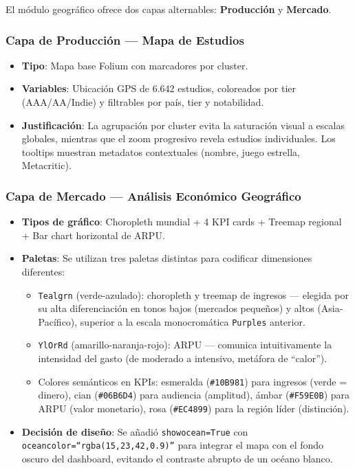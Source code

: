 \documentclass[11pt,a4paper]{article}
\begin{document}
El módulo geográfico ofrece dos capas alternables: \textbf{Producción} y \textbf{Mercado}.

\subsubsection{Capa de Producción — Mapa de Estudios}
\begin{itemize}
  \item \textbf{Tipo}: Mapa base Folium con marcadores por cluster.
  \item \textbf{Variables}: Ubicación GPS de 6.642 estudios, coloreados por tier (AAA/AA/Indie) y filtrables por país, tier y notabilidad.
  \item \textbf{Justificación}: La agrupación por cluster evita la saturación visual a escalas globales, mientras que el zoom progresivo revela estudios individuales. Los tooltips muestran metadatos contextuales (nombre, juego estrella, Metacritic).
\end{itemize}

\subsubsection{Capa de Mercado — Análisis Económico Geográfico}
\begin{itemize}
  \item \textbf{Tipos de gráfico}: Choropleth mundial + 4 KPI cards + Treemap regional + Bar chart horizontal de ARPU.
  \item \textbf{Paletas}: Se utilizan tres paletas distintas para codificar dimensiones diferentes:
  \begin{itemize}
    \item \texttt{Tealgrn} (verde-azulado): choropleth y treemap de ingresos --- elegida por su alta diferenciación en tonos bajos (mercados pequeños) y altos (Asia-Pacífico), superior a la escala monocromática \texttt{Purples} anterior.
    \item \texttt{YlOrRd} (amarillo-naranja-rojo): ARPU --- comunica intuitivamente la intensidad del gasto (de moderado a intensivo, metáfora de ``calor'').
    \item Colores semánticos en KPIs: esmeralda (\texttt{\#10B981}) para ingresos (verde = dinero), cian (\texttt{\#06B6D4}) para audiencia (amplitud), ámbar (\texttt{\#F59E0B}) para ARPU (valor monetario), rosa (\texttt{\#EC4899}) para la región líder (distinción).
  \end{itemize}
  \item \textbf{Decisión de diseño}: Se añadió \texttt{showocean=True} con \texttt{oceancolor=``rgba(15,23,42,0.9)''} para integrar el mapa con el fondo oscuro del dashboard, evitando el contraste abrupto de un océano blanco.
\end{itemize}
\end{document}
